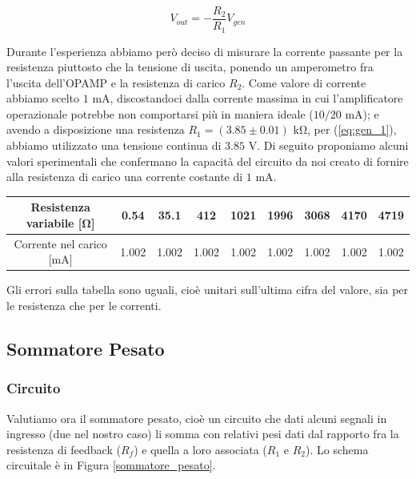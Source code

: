 $$V_{out}=-\frac{R_2}{R_1} V_{gen}$$

Durante l'esperienza abbiamo però deciso di misurare la corrente passante per la resistenza piuttosto che la tensione di uscita, ponendo un amperometro fra l'uscita dell'OPAMP e la resistenza di carico $R_2$. Come valore di corrente abbiamo scelto $1$ \si{\milli\ampere}, discostandoci dalla corrente massima in cui l'amplificatore operazionale potrebbe non comportarsi più in maniera ideale ($10/20$ \si{\milli\ampere}); e avendo a disposizione una resistenza $R_1=(3.85 \pm 0.01)$ \si{\kilo\ohm}, per (\ref{eq:gen_1}), abbiamo utilizzato una tensione continua di $3.85$ \si{\volt}. Di seguito proponiamo alcuni valori sperimentali che confermano la capacità del circuito da noi creato di fornire alla resistenza di carico una corrente costante di $1$ \si{\milli\ampere}.

\begin{center}
\begin{tabular}{c|c|c|c|c|c|c|c|c}
Resistenza variabile [\si{\ohm}] & 0.54 & 35.1 & 412 & 1021 & 1996 & 3068 & 4170 & 4719 \\ 
\hline 
Corrente nel carico [\si{\milli\ampere}] & 1.002 & 1.002 & 1.002 & 1.002 & 1.002 & 1.002 & 1.002 & 1.002 \\ 
\end{tabular}
\end{center}

Gli errori sulla tabella sono uguali, cioè unitari sull'ultima cifra del valore, sia per le resistenza che per le correnti.

\subsection{Sommatore Pesato}

\subsubsection{Circuito}

Valutiamo ora il sommatore pesato, cioè un circuito che dati alcuni segnali in ingresso (due nel nostro caso) li somma con relativi pesi dati dal rapporto fra la resistenza di feedback ($R_f$) e quella a loro associata ($R_1$ e $R_2$). Lo schema circuitale è in Figura \ref{sommatore_pesato}.

